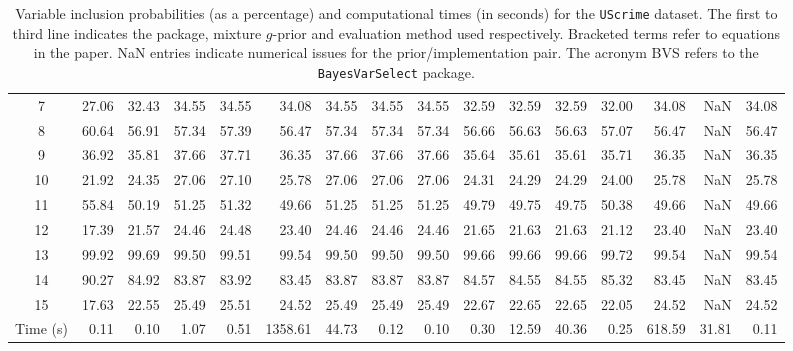 \begin{sidewaystable}[h!]
\begin{center}
{\begin{tabular}{c|r|r|rrrrrr|rrrr|rrr}
				7 & 27.06 & 32.43 & 34.55 & 34.55 & 34.08 & 34.55 & 34.55 & 34.55 & 32.59 & 32.59 & 32.59 & 32.00 & 34.08 & NaN &  34.08 \\ 
				8 & 60.64 & 56.91 & 57.34 & 57.39 & 56.47 & 57.34 & 57.34 & 57.34 & 56.66 & 56.63 & 56.63 & 57.07 & 56.47 & NaN &  56.47 \\ 
				9 & 36.92 & 35.81 & 37.66 & 37.71 & 36.35 & 37.66 & 37.66 & 37.66 & 35.64 & 35.61 & 35.61 & 35.71 & 36.35 & NaN &  36.35 \\ 
				10 & 21.92 & 24.35 & 27.06 & 27.10 & 25.78 & 27.06 & 27.06 & 27.06 & 24.31 & 24.29 & 24.29 & 24.00 & 25.78 & NaN &  25.78 \\ 
				11 & 55.84 & 50.19 & 51.25 & 51.32 & 49.66 & 51.25 & 51.25 & 51.25 & 49.79 & 49.75 & 49.75 & 50.38 & 49.66 & NaN &  49.66 \\ 
				12 & 17.39 & 21.57 & 24.46 & 24.48 & 23.40 & 24.46 & 24.46 & 24.46 & 21.65 & 21.63 & 21.63 & 21.12 & 23.40 & NaN &  23.40 \\ 
				13 & 99.92 & 99.69 & 99.50 & 99.51 & 99.54 & 99.50 & 99.50 & 99.50 & 99.66 & 99.66 & 99.66 & 99.72 & 99.54 & NaN &  99.54 \\ 
				14 & 90.27 & 84.92 & 83.87 & 83.92 & 83.45 & 83.87 & 83.87 & 83.87 & 84.57 & 84.55 & 84.55 & 85.32 & 83.45 & NaN &  83.45 \\ 
				15 & 17.63 & 22.55 & 25.49 & 25.51 & 24.52 & 25.49 & 25.49 & 25.49 & 22.67 & 22.65 & 22.65 & 22.05 & 24.52 & NaN &  24.52 \\ 
				\hline
				Time (s) & 0.11 & 0.10 & 1.07 & 0.51 & 1358.61 & 44.73 & 0.12 & 0.10 & 0.30 &  12.59  & 40.36 & 0.25 & 618.59  &   31.81 & 0.11  \\
				\hline		
			\end{tabular}
		}
	\end{center}
    \caption{Variable inclusion probabilities (as a percentage) and
        computational times (in seconds) for the {\tt UScrime} dataset.  The
        first to third line indicates the package, mixture $g$-prior and
        evaluation method used respectively. Bracketed terms refer to equations
    in the paper. NaN entries indicate numerical issues for the
prior/implementation pair. The acronym BVS refers to the {\tt BayesVarSelect}
package.}
	\label{tab:UScrime}
\end{sidewaystable}

